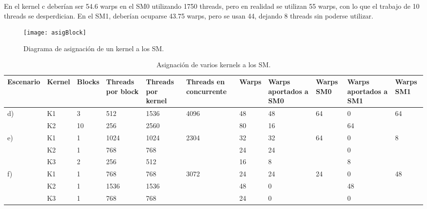    En el kernel c deberían ser 54.6 warps en el SM0 utilizando 1750 threads, pero en realidad se utilizan 55 warps, con lo que el trabajo de 10 threads se desperdician. En el SM1, deberían ocuparse 43.75 warps, pero se usan 44, dejando 8 threads sin poderse utilizar.

    \begin{figure}[ht]
      \centering
        \texttt{[image: asigBlock]}
        \caption{Diagrama de asignación de un kernel a los SM.}
        \label{fig:asigBlock}
    \end{figure}

    \begin{table}[h!]
      \begin{center}
            \scriptsize
        \begin{tabular}{|m{1.5cm}|m{1cm}|m{1cm}|m{1cm}|m{1cm}|m{1cm}|m{1cm}|m{1cm}|m{1cm}|m{1cm}|m{1cm}|}
         \hline
         \cellcolor{lightgray}\textbf{Escenario} & 
         \cellcolor{lightgray}\textbf{Kernel} & 
         \cellcolor{lightgray}\textbf{Blocks} &
         \cellcolor{lightgray}\textbf{Threads por block} &
         \cellcolor{lightgray}\textbf{Threads por kernel} &
         \cellcolor{lightgray}\textbf{Threads en concurrente} &
         \cellcolor{lightgray}\textbf{Warps} &
         \cellcolor{lightgray}\textbf{Warps aportados a SM0} &
         \cellcolor{lightgray}\textbf{Warps SM0} &
         \cellcolor{lightgray}\textbf{Warps aportados a SM1} &
         \cellcolor{lightgray}\textbf{Warps SM1} \\ 
         \hline
         \multirow{2}{1cm}{d)} & K1 & 3  & 512 & 1536 & \multirow{2}{1cm}{4096} & 48 & 48 & \multirow{2}{1cm}{64} & 0  & \multirow{2}{1cm}{64}\\ 
                              & K2 & 10 & 256 & 2560 &                         & 80 & 16 &                       & 64 & \\ 
         \hline \hline
        \multirow{3}{1cm}{e)} & K1 & 1 & 1024 & 1024 & \multirow{3}{1cm}{2304} & 32 & 32 & \multirow{3}{1cm}{64} & 0  & \multirow{3}{1cm}{8}\\ 
                             & K2 & 1 & 768  & 768  &                         & 24 & 24 &                      & 0 & \\ 
                             & K3 & 2 & 256  & 512  &                         & 16 & 8 &                       & 8 & \\ 
         \hline \hline
        \multirow{3}{1cm}{f)} & K1 & 1 & 768  & 768  & \multirow{3}{1cm}{3072} & 24 & 24 & \multirow{3}{1cm}{24} & 0  & \multirow{3}{1cm}{48}\\ 
                             & K2 & 1 & 1536 & 1536 &                         & 48 & 0  &                       & 48 & \\ 
                             & K3 & 1 & 768  & 768  &                         & 24 & 0  &                       & 0 & \\ 
         \hline
           \end{tabular}
        \caption{Asignación de varios kernels a los SM.}
        \label{tab:asigVariosKernelsSM}
      \end{center}
    \end{table}

